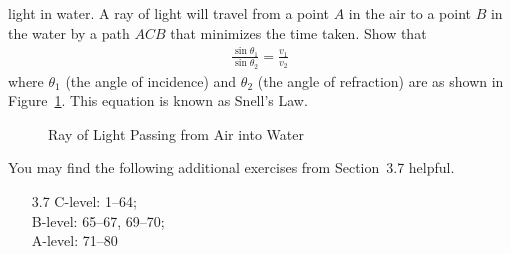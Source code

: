 \documentclass{article}
\begin{document}
\begin{enumerate}
  light in water.  A ray of light will travel from a point $A$ in the
  air to a point $B$ in the water by a path $ACB$ that minimizes the
  time taken.  Show that
  \begin{align*}
    \frac{\sin\theta_1}{\sin\theta_2} = \frac{v_1}{v_2}
  \end{align*}
  where $\theta_1$ (the angle of incidence) and $\theta_2$ (the angle
  of refraction) are as shown in Figure~\ref{fig:snell}.  This
  equation is known as Snell's Law.
  \begin{figure}[htbp]
    \centering
    \caption{Ray of Light Passing from Air into Water}
    \label{fig:snell}
  \end{figure}
\end{enumerate}

\noindent
You may find the following additional exercises from Section~3.7
helpful.
\begin{itemize}
\item[3.7]
  C-level: 1--64; \\
  B-level: 65--67, 69--70; \\
  A-level: 71--80
\end{itemize}
\end{document}
